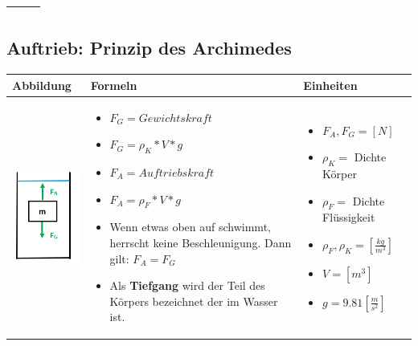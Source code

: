 \begin{table}[h!]
\begin{tabular}{ | m{6cm} | m{6cm} | m{6cm} | }
\begin{itemize}
	\end{itemize}
	\\ \hline
	\end{tabular}
	\end{table}

	\subsection{Auftrieb: Prinzip des Archimedes}				%
	\begin{table}[h!]
	\begin{tabular}{ | m{6cm} | m{7cm} | m{5cm} | }
	\hline
	Abbildung & Formeln & Einheiten \\ \hline
	\midrule
	\begin{minipage}{.3\textwidth}
	\includegraphics[width=3cm]{Figures/Auftrieb.png}
	\end{minipage}
	&
	\begin{itemize}
	\item $F_{G}=Gewichtskraft$
	\item $F_{G}=\rho_{K}*V*g$
	\item $F_{A}=Auftriebskraft$
	\item $F_{A}=\rho_{F}*V*g$
	\item {\color{red}Wenn etwas oben auf schwimmt, herrscht keine Beschleunigung. Dann gilt: $F_{A}=F_{G}$}
	\item {\color{red}Als \textbf{Tiefgang} wird der Teil des Körpers bezeichnet der im Wasser ist. } 
	\end{itemize}

	& 
	\begin{itemize}
	\item $F_{A},F_{G}=[N]$
	\item $\rho_{K}=$ Dichte Körper
	\item $\rho_{F}=$ Dichte Flüssigkeit
	\item $\rho_{F},\rho_{K}=[\frac{kg}{m^{3}}]$
	\item $V=[m^{3}]$
	\item $g=9.81[\frac{m}{s^{2}}]$
	\end{itemize}
	\\ \hline
	\end{tabular}
	\end{table}

